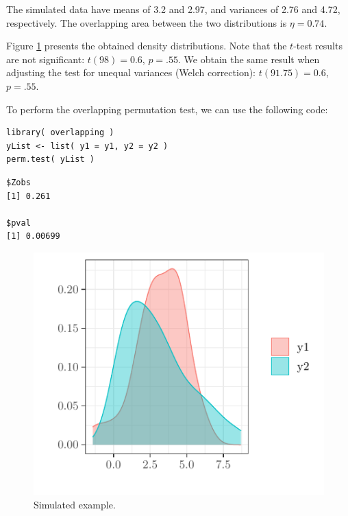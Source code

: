 \documentclass[twocolumn]{article}\usepackage[]{graphicx}\usepackage[]{xcolor}
\makeatletter
\def\maxwidth{ %
  \ifdim\Gin@nat@width>\linewidth
    \linewidth
  \else
    \Gin@nat@width
  \fi
}
\newenvironment{kframe}{%
 \def\at@end@of@kframe{}%
 \ifinner\ifhmode%
  \def\at@end@of@kframe{\end{minipage}}%
  \begin{minipage}{\columnwidth}%
 \fi\fi%
 \def\FrameCommand##1{\hskip\@totalleftmargin \hskip-\fboxsep
 \colorbox{shadecolor}{##1}\hskip-\fboxsep
     \hskip-\linewidth \hskip-\@totalleftmargin \hskip\columnwidth}%
 \MakeFramed {\advance\hsize-\width
   \@totalleftmargin\z@ \linewidth\hsize
   \@setminipage}}%
 {\par\unskip\endMakeFramed%
 \at@end@of@kframe}
\newenvironment{knitrout}{}{} %
\makeatother
\begin{document}
The simulated data have means of  3.2 and 2.97, and variances of 2.76 and 4.72, respectively. The overlapping area between the two distributions is $\eta = 0.74$. 

Figure \ref{fig:example} presents the obtained density distributions. Note that the $t$-test results are not significant: $t(98) = 0.6$, $p = .55$. We obtain the same result when adjusting the test for unequal variances (Welch correction): $t(91.75) = 0.6$, $p = .55$.

To perform the overlapping permutation test, we can use the following code:
\begin{knitrout}
\color{fgcolor}\begin{kframe}
\begin{verbatim}
library( overlapping ) 
yList <- list( y1 = y1, y2 = y2 ) 
perm.test( yList ) 
\end{verbatim}
\end{kframe} 
\begin{kframe}\begin{verbatim}
$Zobs
[1] 0.261

$pval
[1] 0.00699
\end{verbatim}
\end{kframe}
\end{knitrout}


\begin{knitrout}
\color{fgcolor}\begin{figure}

{\centering \includegraphics[width=\maxwidth]{figure/example-1} 

}

\caption[Simulated example]{Simulated example.}\label{fig:example}
\end{figure}

\end{knitrout}
\end{document}
